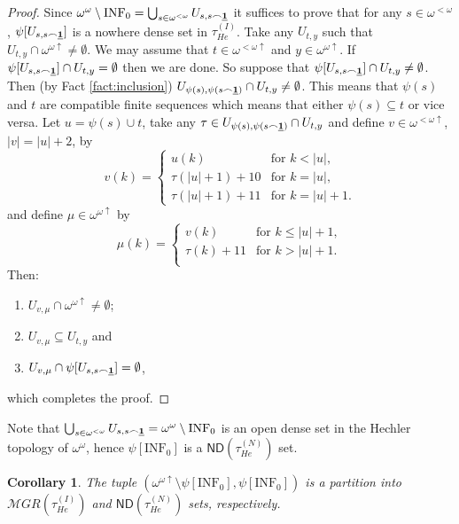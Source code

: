 \documentclass[12pt]{amsart}
\theoremstyle{plain}
\newtheorem{corollary}[theorem]{Corollary}
\theoremstyle{definition}
\theoremstyle{remark}
\newcommand{\baire}{\omega^{\omega}}
\newcommand{\finbaire}{\omega^{<\omega}}
\newcommand{\finincrbaire}{\omega^{< \omega \uparrow}}
\newcommand{\incrbaire}{\omega^{\omega \uparrow}}
\newcommand{\meager}{{\mathcal MGR}}
\newcommand{\ND}{\mathsf{ND}}
\newcommand{\Hechler}[2]{U_{#1,#2}}
\newcommand{\HechlerNative}{\tau_{\mathit{He}}^{(N)}}
\newcommand{\HechlerInduced}{\tau_{\mathit{He}}^{(I)}}
\newcommand{\INFZero}{\mathrm{INF}_0}
\newcommand{\sequenceOnes}{\underline{\bf 1}}
\begin{document}
\begin{proof}
  Since $\baire\setminus\INFZero = \bigcup_{s \in \finbaire} \Hechler{s}{s \frown \sequenceOnes}$
  it suffices to prove that for any ${s \in \finbaire}$,
  $\psi[\Hechler{s}{s \frown \sequenceOnes}]$ is a nowhere dense set in $\HechlerInduced$.
  Take any $\Hechler{t}{y}$ such that $\Hechler{t}{y}\cap\incrbaire\not=\emptyset$.
  We may assume that $t \in \finincrbaire$ and $y \in \incrbaire$.
  If $\psi[\Hechler{s}{s \frown \sequenceOnes}] \cap \Hechler{t}{y} = \emptyset$
  then we are done. So suppose that
  $\psi[\Hechler{s}{s \frown \sequenceOnes}] \cap \Hechler{t}{y} \not= \emptyset$.
  Then (by Fact \ref{fact:inclusion})
  $\Hechler{\psi(s)}{\psi(s \frown \sequenceOnes)} \cap \Hechler{t}{y} \not= \emptyset$.
  This means that $\psi(s)$ and $t$ are compatible finite sequences
  which means that either $\psi(s) \subseteq t$ or vice versa.
  Let $u = \psi(s) \cup t$, take any
  $\tau \in \Hechler{\psi(s)}{\psi(s \frown \sequenceOnes)} \cap \Hechler{t}{y}$
  and define $v \in \finincrbaire$, $|v| = |u| + 2$,
by 
\[
  v(k) = \begin{cases}
    u(k) & \text{for } k < |u|,\\
    \tau(|u| + 1) + 10 & \text{for } k = |u|,\\
    \tau(|u| + 1) + 11 & \text{for } k = |u| + 1.
    \end{cases}
\]
and define $\mu \in \incrbaire$ by
\[
\mu(k) =
\begin{cases}
  v(k) & \text{for } k \leq |u| + 1,\\
  \tau(k) + 11 & \text{for } k > |u| + 1.\\
\end{cases}
\]
Then:
\begin{enumerate}[label=\alph*]
\item $\Hechler{v}{\mu} \cap \incrbaire \not=\emptyset$;
\item $\Hechler{v}{\mu} \subseteq \Hechler{t}{y}$ and
\item $\Hechler{v}{\mu} \cap \psi[\Hechler{s}{s \frown \sequenceOnes}] = \emptyset$,
\end{enumerate}
which completes the proof.
\end{proof}

Note that
$\bigcup_{s \in \finbaire} \Hechler{s}{s \frown \sequenceOnes} = \baire\setminus\INFZero$
is an open dense set in the Hechler topology of $\baire$, hence
$\psi[\INFZero]$ is a $\ND(\HechlerNative)$ set.

\begin{corollary}
The tuple $(\incrbaire\setminus\psi[\INFZero], \psi[\INFZero])$
is a partition into $\meager(\HechlerInduced)$ and $\ND(\HechlerNative)$ sets, respectively.
\end{corollary}
\end{document}
